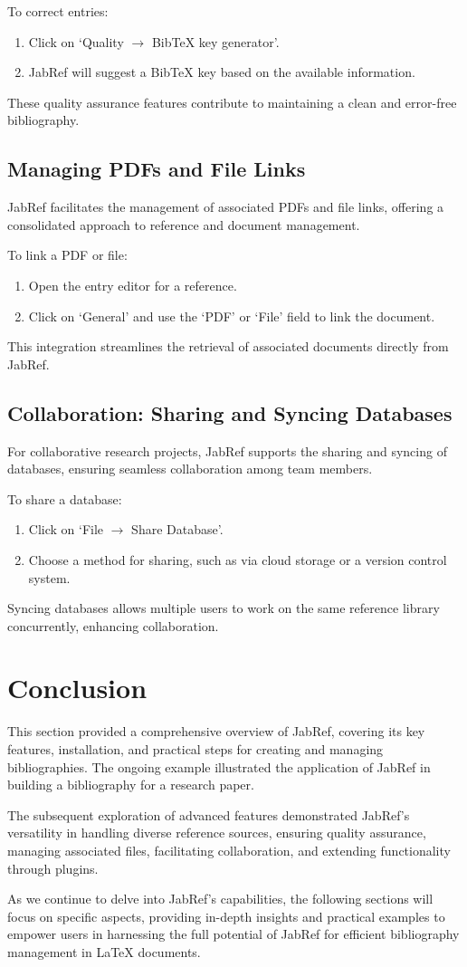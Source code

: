 			To correct entries:
			\begin{enumerate}
				\item Click on `Quality $\rightarrow$ BibTeX key generator'.
				\item JabRef will suggest a BibTeX key based on the available information.
			\end{enumerate}
			These quality assurance features contribute to maintaining a clean and error-free bibliography.

		\subsection{Managing PDFs and File Links}
			JabRef facilitates the management of associated PDFs and file links, offering a consolidated approach to reference and document management.

			To link a PDF or file:
			\begin{enumerate}
				\item Open the entry editor for a reference.
				\item Click on `General' and use the `PDF' or `File' field to link the document.
			\end{enumerate}
			This integration streamlines the retrieval of associated documents directly from JabRef.

		\subsection{Collaboration: Sharing and Syncing Databases}
			For collaborative research projects, JabRef supports the sharing and syncing of databases, ensuring seamless collaboration among team members.

			To share a database:
			\begin{enumerate}
				\item Click on `File $\rightarrow$ Share Database'.
				\item Choose a method for sharing, such as via cloud storage or a version control system.
			\end{enumerate}
			Syncing databases allows multiple users to work on the same reference library concurrently, enhancing collaboration.

	\section{Conclusion}
		This section provided a comprehensive overview of JabRef, covering its key features, installation, and practical steps for creating and managing bibliographies. The ongoing example illustrated the application of JabRef in building a bibliography for a research paper.

		The subsequent exploration of advanced features demonstrated JabRef's versatility in handling diverse reference sources, ensuring quality assurance, managing associated files, facilitating collaboration, and extending functionality through plugins.

		As we continue to delve into JabRef's capabilities, the following sections will focus on specific aspects, providing in-depth insights and practical examples to empower users in harnessing the full potential of JabRef for efficient bibliography management in LaTeX documents.
